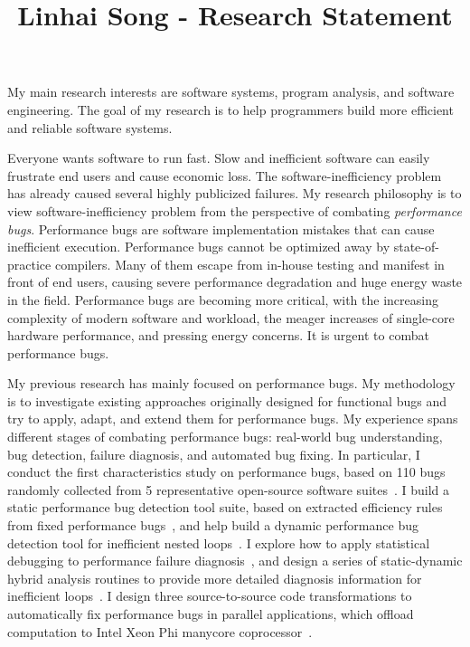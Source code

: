 \documentclass[10pt]{article}
\title{\vspace{-.7in}\bf{Linhai Song - Research Statement\vspace{-.4in}}}
\date{}
\begin{document}
\maketitle\vspace{-.2in}

My main research interests are software systems, program analysis, and software engineering. 
The goal of my research is to help programmers build more efficient and reliable software systems.

Everyone wants software to run fast. 
Slow and inefficient software can easily frustrate end users and cause economic loss. 
The software-inefficiency problem has already caused several highly publicized failures. 
My research philosophy is to view software-inefficiency problem from the perspective of combating \textit{performance bugs}.
Performance bugs are software implementation mistakes that can cause inefficient execution. 
Performance bugs cannot be optimized away by state-of-practice compilers.
Many of them escape from in-house testing and manifest in front of end users, 
causing severe performance degradation and huge energy waste in the field. 
Performance bugs are becoming more critical, with the increasing complexity of modern software and workload, 
the meager increases of single-core hardware performance, 
and pressing energy concerns. 
It is urgent to combat performance bugs.

My previous research has mainly focused on performance bugs.
My methodology is to investigate existing approaches originally
designed for functional bugs and try to apply, adapt, and extend them
for performance bugs.
My experience spans different
stages of combating performance bugs: real-world bug understanding, bug detection,
failure diagnosis, and automated bug fixing.
In particular, I conduct the first characteristics study on performance bugs, based on 110 bugs 
randomly collected from 5 representative open-source software suites~\cite{jin12perfbug}.
I build a static performance bug detection tool suite, based on extracted efficiency rules from fixed performance bugs~\cite{jin12perfbug}, 
and help build a dynamic performance bug detection tool for inefficient nested loops~\cite{Nistor13ICSE}. 
I explore how to apply statistical debugging to performance failure diagnosis~\cite{Song14OOPSLA}, 
and design a series of static-dynamic hybrid analysis routines to provide more detailed diagnosis information for inefficient loops~\cite{Song16PLDI}.
I design three source-to-source code transformations to automatically fix performance bugs in 
parallel applications, which offload computation to Intel Xeon Phi manycore coprocessor~\cite{Song14MICRO}. 
\end{document}
